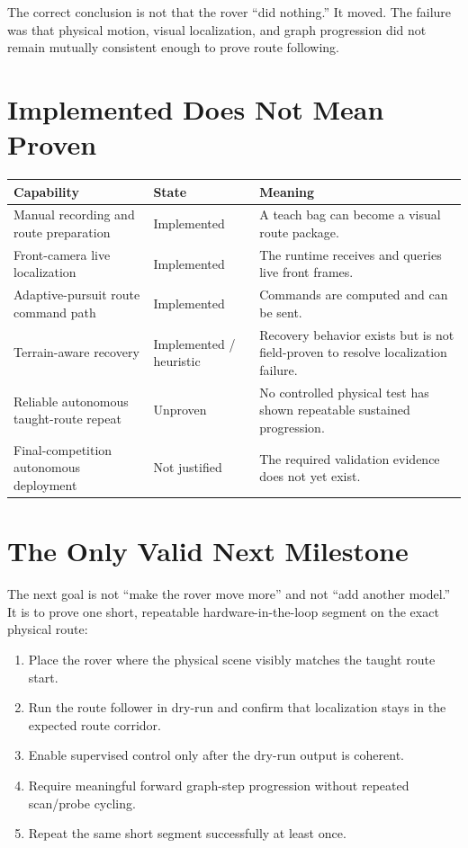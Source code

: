 \documentclass[11pt]{article}
\begin{document}
The correct conclusion is not that the rover ``did nothing.'' It moved. The
failure was that physical motion, visual localization, and graph progression did
not remain mutually consistent enough to prove route following.

\section{Implemented Does Not Mean Proven}

\begin{longtable}{p{}p{}p{}}
\toprule
\textbf{Capability} & \textbf{State} & \textbf{Meaning} \\
\midrule
Manual recording and route preparation & Implemented & A teach bag can become a visual route package. \\
Front-camera live localization & Implemented & The runtime receives and queries live front frames. \\
Adaptive-pursuit route command path & Implemented & Commands are computed and can be sent. \\
Terrain-aware recovery & Implemented / heuristic & Recovery behavior exists but is not field-proven to resolve localization failure. \\
Reliable autonomous taught-route repeat & Unproven & No controlled physical test has shown repeatable sustained progression. \\
Final-competition autonomous deployment & Not justified & The required validation evidence does not yet exist. \\
\bottomrule
\end{longtable}

\section{The Only Valid Next Milestone}

The next goal is not ``make the rover move more'' and not ``add another model.''
It is to prove one short, repeatable hardware-in-the-loop segment on the exact
physical route:

\begin{enumerate}[nosep]
  \item Place the rover where the physical scene visibly matches the taught
  route start.
  \item Run the route follower in dry-run and confirm that localization stays in
  the expected route corridor.
  \item Enable supervised control only after the dry-run output is coherent.
  \item Require meaningful forward graph-step progression without repeated
  scan/probe cycling.
  \item Repeat the same short segment successfully at least once.
\end{enumerate}
\end{document}

